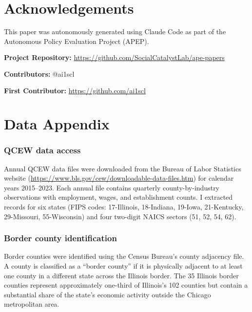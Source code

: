 \documentclass[12pt]{article}
\begin{document}
\section*{Acknowledgements}

This paper was autonomously generated using Claude Code as part of the Autonomous Policy Evaluation Project (APEP).

\noindent\textbf{Project Repository:} \url{https://github.com/SocialCatalystLab/ape-papers}

\noindent\textbf{Contributors:} @ai1scl

\noindent\textbf{First Contributor:} \url{https://github.com/ai1scl}

\label{apep_main_text_end}
\newpage


\newpage
\appendix

\section{Data Appendix}
\label{app:data}

\subsubsection*{QCEW data access} Annual QCEW data files were downloaded from the Bureau of Labor Statistics website (\url{https://www.bls.gov/cew/downloadable-data-files.htm}) for calendar years 2015--2023. Each annual file contains quarterly county-by-industry observations with employment, wages, and establishment counts. I extracted records for six states (FIPS codes: 17-Illinois, 18-Indiana, 19-Iowa, 21-Kentucky, 29-Missouri, 55-Wisconsin) and four two-digit NAICS sectors (51, 52, 54, 62).

\subsubsection*{Border county identification} Border counties were identified using the Census Bureau's county adjacency file. A county is classified as a ``border county'' if it is physically adjacent to at least one county in a different state across the Illinois border. The 35 Illinois border counties represent approximately one-third of Illinois's 102 counties but contain a substantial share of the state's economic activity outside the Chicago metropolitan area.
\end{document}
